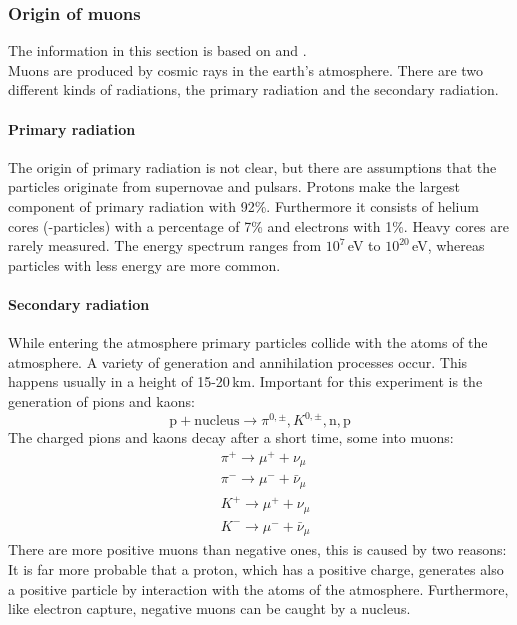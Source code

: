 \subsubsection{Origin of muons}
The information in this section is based on \cite{kosmische-strahlung} and \cite{staatsex}.\\
Muons are produced by cosmic rays in the earth's atmosphere. There are two different kinds of radiations, the primary radiation and the secondary radiation.
\paragraph{Primary radiation}
The origin of primary radiation is not clear, but there are assumptions that the particles originate from supernovae and pulsars.
Protons make the largest component of primary radiation with 92\%. Furthermore it consists of helium cores (\textalpha-particles) with a percentage 
of 7\% and electrons with 1\%. Heavy cores are rarely measured. The energy spectrum ranges from $10^7$\,eV to $10^{20}$\,eV, whereas particles with 
less energy are more common.
\paragraph{Secondary radiation}
While entering the atmosphere primary particles collide with the atoms of the atmosphere. A variety of generation and annihilation processes occur. 
This happens usually in a height of 15-20\,km.
Important for this experiment is the generation of pions and kaons:
\begin{equation}
    \text{p} + \text{nucleus} \rightarrow \pi^{0, \pm}, K^{0, \pm}, \text{n}, \text{p}
\end{equation}
The charged pions and kaons decay after a short time, some into muons:
\begin{equation}
    \begin{split}
        & \pi^+ \rightarrow \mu^+ + \nu_\mu \\
        & \pi^- \rightarrow \mu^- + \bar{\nu}_\mu \\
        & K^+ \rightarrow \mu^+ + \nu_\mu \\
        & K^- \rightarrow \mu^- + \bar{\nu}_\mu
    \end{split}
\end{equation}
There are more positive muons than negative ones, this is caused by two reasons: It is far more probable that a proton, which has 
a positive charge, generates also a positive particle by interaction with the atoms of the atmosphere. Furthermore, like electron capture, negative muons can be 
caught by a nucleus.
